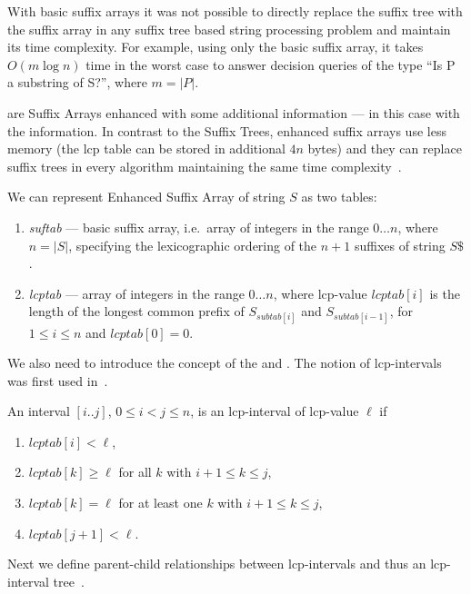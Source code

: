 With basic suffix arrays it was not possible to directly replace the suffix tree with the suffix array in any suffix tree based string processing problem and maintain its time complexity. For example, using only the basic suffix array, it takes $O(m \log n)$ time in the worst case to answer decision queries of the type ``Is P a substring of S?'', where $m = |P|$.

 are Suffix Arrays enhanced with some additional information --- in this case with the  information.
In contrast to the Suffix Trees, enhanced suffix arrays use less memory (the lcp table can be stored in additional $4n$ bytes) and they can replace suffix trees in every algorithm maintaining the same time complexity~\cite{enhancedsuffixarrays}.

We can represent Enhanced Suffix Array of string $S$ as two tables:
\begin{enumerate}
  \item \emph{suftab} --- basic suffix array, i.e.\ array of integers in the range $0\dots n$, where $n = |S|$, specifying the lexicographic ordering of the $n + 1$ suffixes of string $S\$ $.
  \item \emph{lcptab} --- array of integers in the range $0\dots n$, where lcp-value $lcptab[i]$ is the length of the longest common prefix of $S_{subtab[i]}$ and $S_{subtab[i-1]}$, for $1 \leq i \leq n$ and $lcptab[0] = 0$.
\end{enumerate}

We also need to introduce the concept of the  and . The notion of lcp-intervals was first used in~\cite{enhancedsuffixarrays}.
\begin{definition}
An interval $[i..j]$, $0 \leq i < j \leq n$, is an lcp-interval of lcp-value $\ell$ if

\begin{enumerate}
\item $lcptab[i] < \ell$,
\item $lcptab[k] \geq \ell$ for all $k$ with $i + 1 \leq k \leq j$,
\item $lcptab[k] = \ell$ for at least one $k$ with $i + 1 \leq k \leq j$,
\item $lcptab[j + 1] < \ell$.
\end{enumerate}
\end{definition}

Next we define parent-child relationships between lcp-intervals and thus an lcp-interval tree~\cite{enhancedsuffixarrays}.

